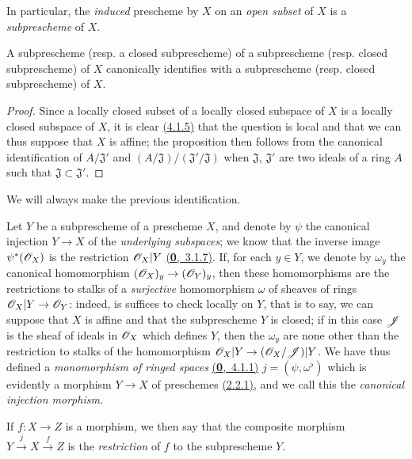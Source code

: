 In particular, the {\it induced} prescheme by $X$ on an {\it open subset} of $X$ is a
{\it subprescheme} of $X$.

\begin{prop}[4.1.6]
\label{prop-1.4.1.6}
A subprescheme (resp. a closed subprescheme) of a subprescheme
(resp. closed subprescheme) of $X$ canonically identifies with a subprescheme
(resp. closed subprescheme) of $X$.
\end{prop}

\begin{proof}
\label{proof-prop-1.4.1.6}
Since a locally closed subset of a locally closed subspace of $X$ is a locally closed
subspace of $X$, it is clear \hyperref[prop-1.4.1.5]{(4.1.5)} that the question is local
and that we can thus suppose that $X$ is affine; the proposition then follows from the
canonical identification of $A/\mathfrak{J}'$ and
$(A/\mathfrak{J})/(\mathfrak{J}'/\mathfrak{J})$ when $\mathfrak{J}$, $\mathfrak{J}'$ are
two ideals of a ring $A$ such that $\mathfrak{J}\subset\mathfrak{J}'$.
\end{proof}

We will always make the previous identification.
\begin{env}[4.1.7]
\label{env-1.4.1.7}
Let $Y$ be a subprescheme of a prescheme $X$, and denote by $\psi$ the canonical injection
$Y\to X$ of the {\it underlying subspaces}; we know that the inverse image $\psi^*(\mathscr{O}_X)$ is
the restriction $\mathscr{O}_X|Y$ \hyperref[env-0.3.7.1]{(\textbf{0},~3.1.7)}. If, for each $y\in Y$,
we denote by $\omega_y$ the canonical homomorphism $(\mathscr{O}_X)_y\to(\mathscr{O}_Y)_y$, then these
homomorphisms are the restrictions to stalks of a {\it surjective} homomorphism $\omega$
of sheaves of rings $\mathscr{O}_X|Y\to\mathscr{O}_Y$: indeed, is suffices to check locally on $Y$, that is
to say, we can suppose that $X$ is affine and that the subprescheme $Y$ is closed; if in this
case $\mathscr{J}$ is the sheaf of ideals in $\mathscr{O}_X$ which defines $Y$, then the $\omega_y$ are
none other than the restriction to stalks of the homomorphism $\mathscr{O}_X|Y\to(\mathscr{O}_X/\mathscr{J})|Y$.
We have thus defined a
{\it monomorphism of ringed spaces} \hyperref[env-0.4.1.1]{(\textbf{0},~4.1.1)}
$j=(\psi,\omega^\flat)$ which is evidently a morphism $Y\to X$ of
preschemes \hyperref[defn-1.2.2.1]{(2.2.1)}, and we call this the
{\it canonical injection morphism}.

If $f:X\to Z$ is a morphism, we then say that the composite morphism
$Y\xrightarrow{j}X\xrightarrow{f}Z$ is the {\it restriction} of $f$ to the subprescheme $Y$.
\end{env}




